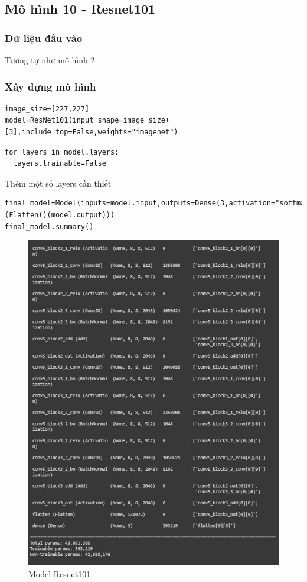 \subsection{Mô hình 10 - Resnet101}
\subsubsection{Dữ liệu đầu vào}
Tương tự như mô hình 2
\subsubsection{Xây dựng mô hình}
\begin{lstlisting}
image_size=[227,227]
model=ResNet101(input_shape=image_size+[3],include_top=False,weights="imagenet")
\end{lstlisting}
\begin{lstlisting}
for layers in model.layers:
  layers.trainable=False
\end{lstlisting}
Thêm một số layers cần thiết
\begin{lstlisting}
final_model=Model(inputs=model.input,outputs=Dense(3,activation="softmax")(Flatten()(model.output)))
final_model.summary()
\end{lstlisting}

\begin{center}
    \begin{figure}[!h]
        \centering
        \includegraphics[scale = 1]{fileanh/37.jpg}
        \caption{Model Resnet101}
    \end{figure}
\end{center}

